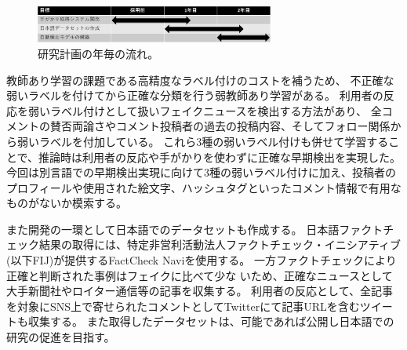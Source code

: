 \setlength\intextsep{0pt}
\setlength\textfloatsep{0pt}
\begin{figure}
    \centering
    \includegraphics[width=0.7\textwidth]{figs/plan.pdf}
    \vspace{-1cm} 
    \caption{研究計画の年毎の流れ。}
    \label{fig:plan}
\end{figure}
教師あり学習の課題である高精度なラベル付けのコストを補うため、
不正確な弱いラベルを付けてから正確な分類を行う弱教師あり学習がある。
利用者の反応を弱いラベル付けとして扱いフェイクニュースを検出する方法があり\cite{shu2020leveraging}、
全コメントの賛否両論さやコメント投稿者の過去の投稿内容、そしてフォロー関係から弱いラベルを付加している。
これら3種の弱いラベル付けも併せて学習することで、推論時は利用者の反応や手がかりを使わずに正確な早期検出を実現した。
今回は別言語での早期検出実現に向けて3種の弱いラベル付けに加え、投稿者のプロフィールや使用された絵文字、ハッシュタグといったコメント情報で有用なものがないか模索する。

また開発の一環として日本語でのデータセットも作成する。
日本語ファクトチェック結果の取得には、特定非営利活動法人ファクトチェック・イニシアティブ(以下FIJ)が提供するFactCheck Naviを使用する。
一方ファクトチェックにより正確と判断された事例はフェイクに比べて少な%
いため、正確なニュースとして大手新聞社やロイター通信等の記事を収集する。
利用者の反応として、全記事を対象にSNS上で寄せられたコメントとしてTwitterにて記事URLを含むツイートも収集する。
また取得したデータセットは、可能であれば公開し日本語での研究の促進を目指す。

